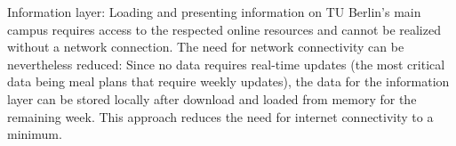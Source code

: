 Information layer: Loading and presenting information on TU Berlin's main campus requires access to the respected online resources and cannot be realized without a network connection. The need for network connectivity can be nevertheless reduced: Since no data requires real-time updates (the most critical data being meal plans that require weekly updates), the data for the information layer can be stored locally after download and loaded from memory for the remaining week. This approach reduces the need for internet connectivity to a minimum.


\newpage

